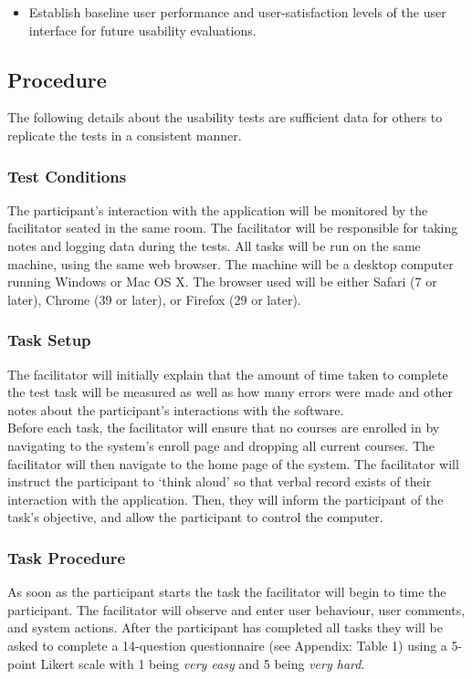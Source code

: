 \documentclass[10pt]{article}
\begin{document}
\begin{multicols}{2}
\begin{itemize}
\item Establish baseline user performance and user-satisfaction levels of the user interface for future usability evaluations.
\end{itemize}

\subsection*{Procedure}
The following details about the usability tests are sufficient data for others to replicate the tests in a consistent manner.
 
\subsubsection*{Test Conditions}
The participant's interaction with the application will be monitored by the facilitator seated in the same room. The facilitator will be responsible for taking notes and logging data during the tests. All tasks will be run on the same machine, using the same web browser. The machine will be a desktop computer running Windows or Mac OS X. The browser used will be either Safari (7 or later), Chrome (39 or later), or Firefox (29 or later).

\subsubsection*{Task Setup}
The facilitator will initially explain that the amount of time taken to complete the test task will be measured as well as how many errors were made and other notes about the participant's interactions with the software.\\

Before each task, the facilitator will ensure that no courses are enrolled in by navigating to the system's enroll page and dropping all current courses. The facilitator will then navigate to the home page of the system. The facilitator will instruct the participant to `think aloud' so that verbal record exists of their interaction with the application. Then, they will  inform the participant of the task's objective, and allow the participant to control the computer.

\subsubsection*{Task Procedure}
As soon as the participant starts the task the facilitator will begin to time the participant. The facilitator will observe and enter user behaviour, user comments, and system actions. After the participant has completed all tasks they will be asked to complete a 14-question questionnaire (see Appendix: Table 1) using a 5-point Likert scale with 1 being \emph{very easy} and 5 being \emph{very hard}.


\end{multicols}
\end{document}
